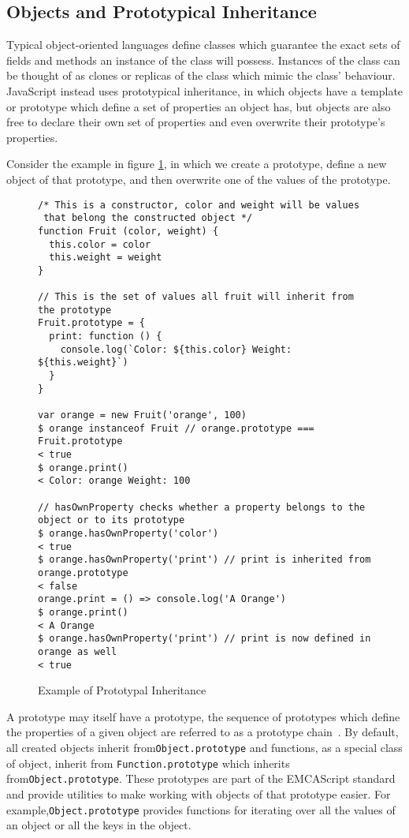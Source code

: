 \documentclass[]{final_report}
\begin{document}
\subsection{Objects and Prototypical Inheritance}
Typical object-oriented languages define classes which guarantee the exact sets of fields and methods an instance of the class will possess. Instances of the class can be thought of as clones or replicas of the class which mimic the class' behaviour. JavaScript instead uses prototypical inheritance, in which objects have a template or prototype which define a set of properties an object has, but objects are also free to declare their own set of properties and even overwrite their prototype's properties. 

Consider the example in figure \ref{fig:js-prototypical-inheritance}, in which we create a prototype, define a new object of that prototype, and then overwrite one of the values of the prototype.

\begin{figure}[h]
\begin{verbatim}
/* This is a constructor, color and weight will be values
 that belong the constructed object */
function Fruit (color, weight) {
  this.color = color
  this.weight = weight
}

// This is the set of values all fruit will inherit from the prototype
Fruit.prototype = {
  print: function () {
    console.log(`Color: ${this.color} Weight: ${this.weight}`)
  }
}

var orange = new Fruit('orange', 100)
$ orange instanceof Fruit // orange.prototype === Fruit.prototype
< true
$ orange.print()
< Color: orange Weight: 100

// hasOwnProperty checks whether a property belongs to the object or to its prototype
$ orange.hasOwnProperty('color') 
< true
$ orange.hasOwnProperty('print') // print is inherited from orange.prototype
< false
orange.print = () => console.log('A Orange')
$ orange.print()
< A Orange
$ orange.hasOwnProperty('print') // print is now defined in orange as well
< true
\end{verbatim}
\caption{\label{fig:js-prototypical-inheritance} Example of Prototypal Inheritance}
\end{figure} 

A prototype may itself have a prototype, the sequence of prototypes which define the properties of a given object are referred to as a prototype chain~\cite{EcmaScript, borning1986classes}. By default, all created objects inherit from\lstinline{Object.prototype} and functions, as a special class of object, inherit from \lstinline{Function.prototype} which inherits from\lstinline{Object.prototype}. These prototypes are part of the EMCAScript standard and provide utilities to make working with objects of that prototype easier. For example,\lstinline{Object.prototype} provides functions for iterating over all the values of an object or all the keys in the object.
\end{document}
